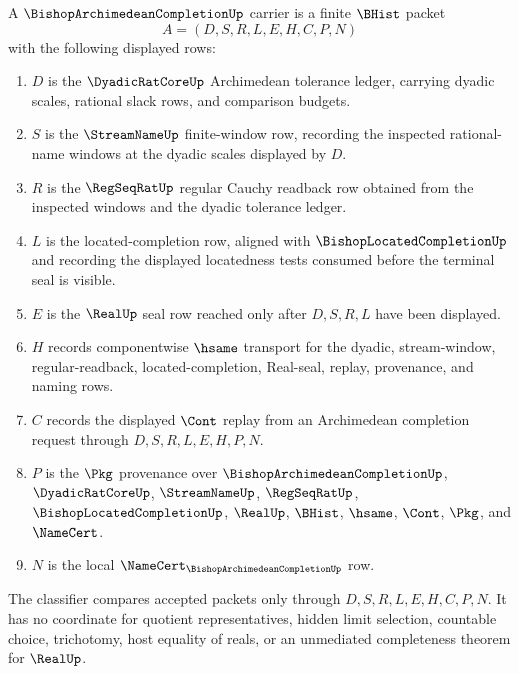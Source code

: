 \begin{definition}
\label{def:bishop-archimedean-completion-carrier}
A $\BishopArchimedeanCompletionUp$ carrier is a finite $\BHist$ packet
$$
A=(D,S,R,L,E,H,C,P,N)
$$
with the following displayed rows:
\begin{enumerate}
\item $D$ is the $\DyadicRatCoreUp$ Archimedean tolerance ledger, carrying dyadic scales, rational slack rows, and comparison budgets.
\item $S$ is the $\StreamNameUp$ finite-window row, recording the inspected rational-name windows at the dyadic scales displayed by $D$.
\item $R$ is the $\RegSeqRatUp$ regular Cauchy readback row obtained from the inspected windows and the dyadic tolerance ledger.
\item $L$ is the located-completion row, aligned with $\BishopLocatedCompletionUp$ and recording the displayed locatedness tests consumed before the terminal seal is visible.
\item $E$ is the $\RealUp$ seal row reached only after $D,S,R,L$ have been displayed.
\item $H$ records componentwise $\hsame$ transport for the dyadic, stream-window, regular-readback, located-completion, Real-seal, replay, provenance, and naming rows.
\item $C$ records the displayed $\Cont$ replay from an Archimedean completion request through $D,S,R,L,E,H,P,N$.
\item $P$ is the $\Pkg$ provenance over $\BishopArchimedeanCompletionUp$, $\DyadicRatCoreUp$, $\StreamNameUp$, $\RegSeqRatUp$, $\BishopLocatedCompletionUp$, $\RealUp$, $\BHist$, $\hsame$, $\Cont$, $\Pkg$, and $\NameCert$.
\item $N$ is the local $\NameCert_{\BishopArchimedeanCompletionUp}$ row.
\end{enumerate}
The classifier compares accepted packets only through $D,S,R,L,E,H,C,P,N$. It has no coordinate for quotient representatives, hidden limit selection, countable choice, trichotomy, host equality of reals, or an unmediated completeness theorem for $\RealUp$.
\end{definition}

